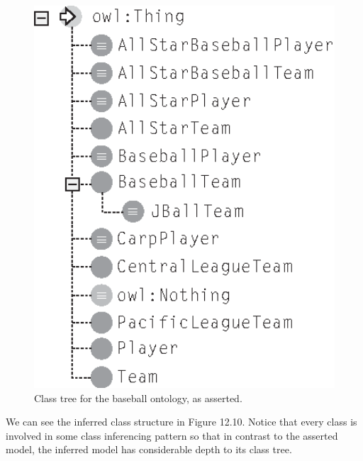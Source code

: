 \begin{figure}
\centering
\includegraphics[width=5in]{media/ch13/f13-09.eps}
\caption{Class tree for the baseball ontology, as asserted.}
\label{fig:ch13.09}
\end{figure}



We can see the inferred class structure in Figure 12.10. Notice that
every class is involved in some class inferencing pattern so that in
contrast to the asserted model, the inferred model has considerable
depth to its class tree.

